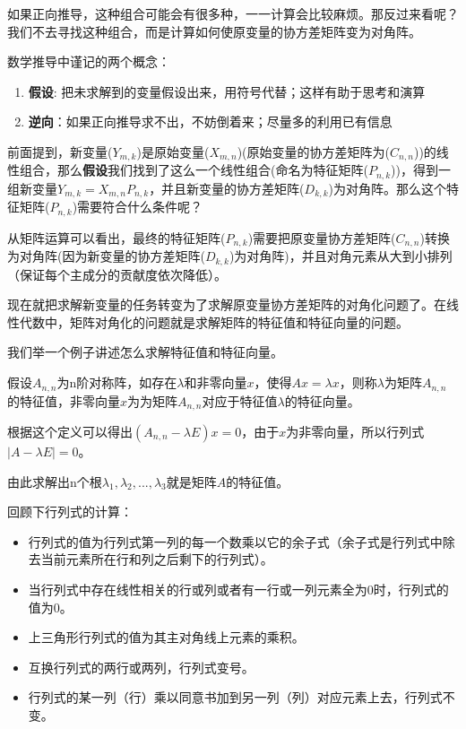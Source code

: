 \documentclass[]{article}
\providecommand{\tightlist}{%
  \setlength{\itemsep}{0pt}\setlength{\parskip}{0pt}}
\numberwithin{figure}{section}
\numberwithin{table}{section}
\theoremstyle{definition}
\theoremstyle{definition}
\theoremstyle{definition}
\theoremstyle{remark}
\begin{document}
如果正向推导，这种组合可能会有很多种，一一计算会比较麻烦。那反过来看呢？
我们不去寻找这种组合，而是计算如何使原变量的协方差矩阵变为对角阵。

数学推导中谨记的两个概念：

\begin{enumerate}
\def\labelenumi{\arabic{enumi}.}
\tightlist
\item
  \textbf{假设}:
  把未求解到的变量假设出来，用符号代替；这样有助于思考和演算
\item
  \textbf{逆向}：如果正向推导求不出，不妨倒着来；尽量多的利用已有信息
\end{enumerate}

前面提到，新变量(\(Y_{m,k}\))是原始变量(\(X_{m,n}\))(原始变量的协方差矩阵为(\(C_{n,n}\)))的线性组合，那么\textbf{假设}我们找到了这么一个线性组合(命名为特征矩阵(\(P_{n,k}\)))，得到一组新变量\(Y_{m,k}=X_{m,n}P_{n,k}\)，并且新变量的协方差矩阵(\(D_{k,k}\))为对角阵。那么这个特征矩阵(\(P_{n,k}\))需要符合什么条件呢？

从矩阵运算可以看出，最终的特征矩阵(\(P_{n,k}\))需要把原变量协方差矩阵(\(C_{n,n}\))转换为对角阵(因为新变量的协方差矩阵(\(D_{k,k}\))为对角阵)，并且对角元素从大到小排列（保证每个主成分的贡献度依次降低）。

现在就把求解新变量的任务转变为了求解原变量协方差矩阵的对角化问题了。在线性代数中，矩阵对角化的问题就是求解矩阵的特征值和特征向量的问题。

我们举一个例子讲述怎么求解特征值和特征向量。

假设\(A_{n,n}\)为n阶对称阵，如存在\(\lambda\)和非零向量\(x\)，使得\(Ax=\lambda x\)，则称\(\lambda\)为矩阵\(A_{n,n}\)的特征值，非零向量\(x\)为为矩阵\(A_{n,n}\)对应于特征值\(\lambda\)的特征向量。

根据这个定义可以得出\((A_{n,n} - \lambda E)x = 0\)，由于\(x\)为非零向量，所以行列式\(|A-\lambda E| = 0\)。

由此求解出n个根\(\lambda_{1}, \lambda_{2}, ..., \lambda_{3}\)就是矩阵\(A\)的特征值。

回顾下行列式的计算：

\begin{itemize}
\tightlist
\item
  行列式的值为行列式第一列的每一个数乘以它的余子式（余子式是行列式中除去当前元素所在行和列之后剩下的行列式）。
\item
  当行列式中存在线性相关的行或列或者有一行或一列元素全为0时，行列式的值为0。
\item
  上三角形行列式的值为其主对角线上元素的乘积。
\item
  互换行列式的两行或两列，行列式变号。
\item
  行列式的某一列（行）乘以同意书加到另一列（列）对应元素上去，行列式不变。
\end{itemize}
\end{document}
